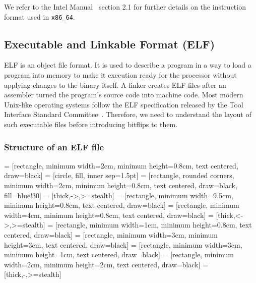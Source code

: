 We refer to the Intel Manual~\cite{intelsys} section 2.1 for further details on
the instruction format used in \texttt{x86\_64}.

\subsection{Executable and Linkable Format (ELF)}

ELF is an object file format. It is used to describe a program in a way to load
a program into memory to make it execution ready for the processor without
applying changes to the binary itself. A linker creates ELF files after an
assembler turned the program's source code into machine code. Most modern
Unix-like operating systems follow the ELF specification released by the Tool
Interface Standard Committee~\cite{elfspec}. Therefore, we need to understand
the layout of such executable files before introducing bitflips to them.

\subsubsection{Structure of an ELF file}

 = [rectangle, minimum width=2cm, minimum height=0.8cm,
text centered, draw=black]
 = [circle, fill, inner sep=1.5pt]
 = [rectangle, rounded corners, minimum width=2cm,
minimum height=0.8cm, text centered, draw=black, fill=blue!30]
 = [thick,->,>=stealth]
 = [rectangle, minimum width=9.5cm, minimum
height=0.8cm, text centered, draw=black]
 = [rectangle, minimum width=4cm, minimum
height=0.8cm, text centered, draw=black]
 = [thick,<->,>=stealth]
 = [rectangle, minimum width=1cm, minimum height=0.8cm,
text centered, draw=black]
 = [rectangle, minimum width=3cm, minimum height=3cm,
                        text centered, draw=black]
 = [rectangle, minimum width=3cm, minimum height=1cm,
                       text centered, draw=black]
 = [rectangle, minimum width=2cm, minimum height=2cm,
                        text centered, draw=black]
 = [thick,-,>=stealth]

